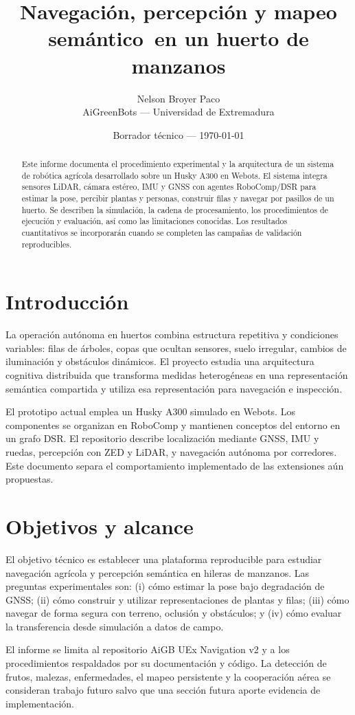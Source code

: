 \documentclass[12pt,a4paper]{article}
\title{\color{aigblue}Navegación, percepción y mapeo semántico\ en un huerto de manzanos}
\author{Nelson Broyer Paco \\ AiGreenBots --- Universidad de Extremadura}
\date{Borrador técnico — \today}
\begin{document}
\maketitle
\begin{abstract}
Este informe documenta el procedimiento experimental y la arquitectura de un sistema de robótica agrícola desarrollado sobre un Husky A300 en Webots. El sistema integra sensores LiDAR, cámara estéreo, IMU y GNSS con agentes RoboComp/DSR para estimar la pose, percibir plantas y personas, construir filas y navegar por pasillos de un huerto. Se describen la simulación, la cadena de procesamiento, los procedimientos de ejecución y evaluación, así como las limitaciones conocidas. Los resultados cuantitativos se incorporarán cuando se completen las campañas de validación reproducibles.
\end{abstract}
\tableofcontents
\listoffigures
\listoftables
\section{Introducción}
La operación autónoma en huertos combina estructura repetitiva y condiciones variables: filas de árboles, copas que ocultan sensores, suelo irregular, cambios de iluminación y obstáculos dinámicos. El proyecto estudia una arquitectura cognitiva distribuida que transforma medidas heterogéneas en una representación semántica compartida y utiliza esa representación para navegación e inspección.

El prototipo actual emplea un Husky A300 simulado en Webots. Los componentes se organizan en RoboComp y mantienen conceptos del entorno en un grafo DSR. El repositorio describe localización mediante GNSS, IMU y ruedas, percepción con ZED y LiDAR, y navegación autónoma por corredores. Este documento separa el comportamiento implementado de las extensiones aún propuestas.
\section{Objetivos y alcance}
El objetivo técnico es establecer una plataforma reproducible para estudiar navegación agrícola y percepción semántica en hileras de manzanos. Las preguntas experimentales son: (i) cómo estimar la pose bajo degradación de GNSS; (ii) cómo construir y utilizar representaciones de plantas y filas; (iii) cómo navegar de forma segura con terreno, oclusión y obstáculos; y (iv) cómo evaluar la transferencia desde simulación a datos de campo.

El informe se limita al repositorio AiGB UEx Navigation v2 y a los procedimientos respaldados por su documentación y código. La detección de frutos, malezas, enfermedades, el mapeo persistente y la cooperación aérea se consideran trabajo futuro salvo que una sección futura aporte evidencia de implementación.
\end{document}

